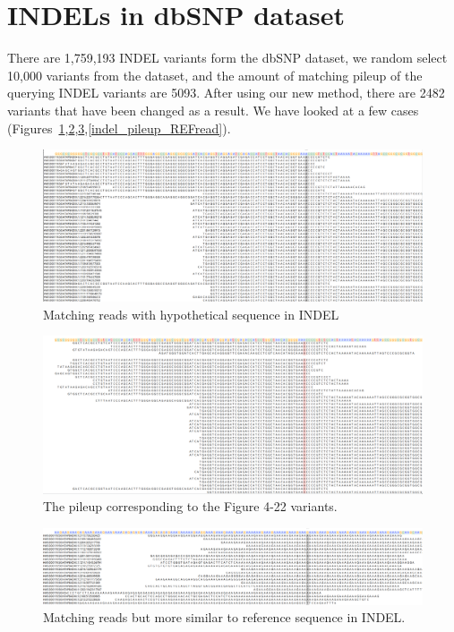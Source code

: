 \section{INDELs in dbSNP dataset}

There are 1,759,193 INDEL variants form the dbSNP dataset, we random select 10,000 variants from the dataset, and the amount of matching pileup of the querying INDEL variants are 5093. After using our new method, there are 2482 variants that have been changed as a result.  We have looked at a few cases (Figures~\ref{indel_new_ALTread},\ref{indel_pileup_ALTread},\ref{indel_new_REFread},\ref{indel_pileup_REFread}).

\begin{figure}[H]
\centering
\includegraphics[width=1\columnwidth]{body/image/indel_new_ALTread.png}
\caption[INDEL match reads]{Matching reads with hypothetical sequence in INDEL}
\label{indel_new_ALTread}
\end{figure}

\begin{figure}[H]
\centering
\includegraphics[width=1\columnwidth]{body/image/indel_pileup_ALTread.png}
\caption[Figure 4.22 pileup]{The pileup corresponding to the Figure 4-22 variants.}
\label{indel_pileup_ALTread}
\end{figure}

\begin{figure}[H]
\centering
\includegraphics[width=1\columnwidth]{body/image/indel_new_REFread.png}
\caption[INDEL worse match reads]{Matching reads but more similar to reference sequence in INDEL.}
\label{indel_new_REFread}
\end{figure}

